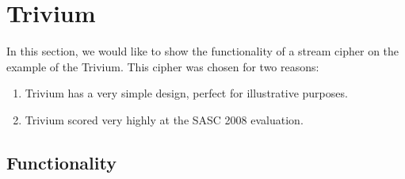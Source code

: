 	\section{Trivium}
	
	In this section, we would like to show the functionality of a stream cipher on the example of the Trivium. This cipher was chosen for two reasons:
	\begin{enumerate}
		\setlength\itemsep{0.1em}
		\item Trivium has a very simple design, perfect for illustrative purposes.
		\item Trivium scored very highly at the SASC 2008 evaluation.
	\end{enumerate}
	
	\subsection{Functionality}
	
